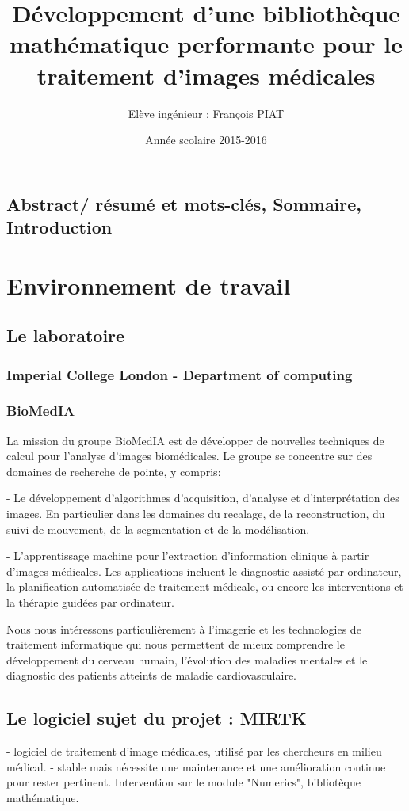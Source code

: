 \documentclass[12pt]{report}
\title{Développement d'une bibliothèque mathématique performante pour le traitement d'images médicales}
\author{Elève ingénieur : François PIAT}
\date{Année scolaire 2015-2016}
\begin{document}
	
\maketitle
\section*{Abstract/ résumé et mots-clés, Sommaire, Introduction} %

\chapter{Environnement de travail} 
	\section{Le laboratoire}
	\subsection{Imperial College London - Department of computing}
	\subsection{BioMedIA}
	La mission du groupe BioMedIA est de développer de nouvelles techniques de
	calcul pour l'analyse d'images biomédicales. Le groupe se concentre sur des
	domaines de recherche de pointe, y compris:

	- Le développement d'algorithmes d'acquisition, d'analyse et d'interprétation
	des images. En particulier dans les domaines du recalage, de la reconstruction,
	du suivi de mouvement, de la segmentation et de la modélisation.

	- L'apprentissage machine pour l'extraction d'information clinique à partir
	d'images médicales. Les applications incluent le diagnostic assisté par
	ordinateur, la planification automatisée de traitement médicale, ou encore les
	interventions et la thérapie guidées par ordinateur.

	Nous nous intéressons particulièrement à l'imagerie et les technologies de
	traitement informatique qui nous permettent de mieux comprendre le
	développement du cerveau humain, l’évolution des maladies mentales et le
	diagnostic des patients atteints de maladie cardiovasculaire.

	\section{Le logiciel sujet du projet : MIRTK}
	 - logiciel de traitement d'image médicales, utilisé par les chercheurs en milieu médical.
	 - stable mais nécessite une maintenance et une amélioration continue pour rester pertinent.
	 Intervention sur le module "Numerics", bibliotèque mathématique.
\end{document}
